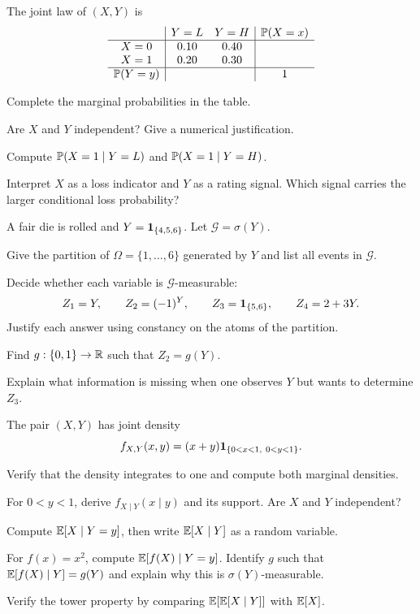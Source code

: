 \begin{exercise}
The joint law of $(X,Y)$ is
\[
\begin{array}{c|cc|c}
 & Y=L & Y=H & \mathbb P(X=x)\\ \hline
X=0 & 0.10 & 0.40 & {}\\
X=1 & 0.20 & 0.30 & {}\\ \hline
\mathbb P(Y=y) & {} & {} & 1
\end{array}
\]
\begin{exparts}
  \item Complete the marginal probabilities in the table.
  \item Are $X$ and $Y$ independent? Give a numerical justification.
  \item Compute $\mathbb P(X=1\mid Y=L)$ and $\mathbb P(X=1\mid Y=H)$.
  \item Interpret $X$ as a loss indicator and $Y$ as a rating signal. Which
  signal carries the larger conditional loss probability?
\end{exparts}
\end{exercise}

\begin{exercise}
A fair die is rolled and $Y=\mathbf{1}_{\{4,5,6\}}$. Let $\mathcal G=\sigma(Y)$.
\begin{exparts}
  \item Give the partition of $\Omega=\{1,\ldots,6\}$ generated by $Y$ and
  list all events in $\mathcal G$.
  \item Decide whether each variable is $\mathcal G$-measurable:
  \[
  Z_1=Y,\qquad Z_2=(-1)^Y,\qquad
  Z_3=\mathbf{1}_{\{5,6\}},\qquad Z_4=2+3Y.
  \]
  Justify each answer using constancy on the atoms of the partition.
  \item Find $g:\{0,1\}\to\mathbb{R}$ such that $Z_2=g(Y)$.
  \item Explain what information is missing when one observes $Y$ but wants
  to determine $Z_3$.
\end{exparts}
\end{exercise}

\begin{exercise}
The pair $(X,Y)$ has joint density
\[
f_{X,Y}(x,y)=(x+y)\1_{\{0<x<1,\ 0<y<1\}}.
\]
\begin{exparts}
  \item Verify that the density integrates to one and compute both marginal densities.
  \item For $0<y<1$, derive $f_{X\mid Y}(x\mid y)$ and its support. Are
  $X$ and $Y$ independent?
  \item Compute $\mathbb E[X\mid Y=y]$, then write $\mathbb E[X\mid Y]$ as a random variable.
  \item For $f(x)=x^2$, compute $\mathbb E[f(X)\mid Y=y]$. Identify $g$ such that
  $\mathbb E[f(X)\mid Y]=g(Y)$ and explain why this is $\sigma(Y)$-measurable.
  \item Verify the tower property by comparing $\mathbb E[\mathbb E[X\mid Y]]$ with $\mathbb E[X]$.
\end{exparts}
\end{exercise}

